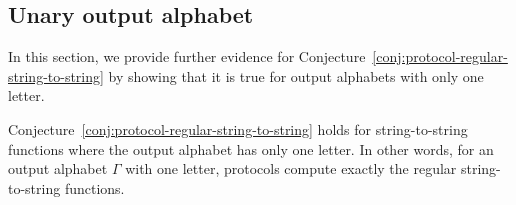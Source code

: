 \subsection{Unary output alphabet}
\label{sec:unary-output-alphabet}
\AP
In this section, we provide further evidence for
Conjecture~\ref{conj:protocol-regular-string-to-string}
 by showing that it is true for output
alphabets with only one letter. 

\begin{theorem}\label{thm:unary-string-to-string}
  Conjecture~\ref{conj:protocol-regular-string-to-string} holds for string-to-string functions where the output alphabet has only one letter. In other words, for an output alphabet $\Gamma$ with one letter, protocols compute exactly the regular string-to-string functions. 
  
\end{theorem}

